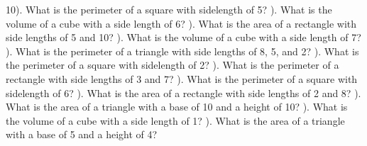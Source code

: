 \documentclass{article}%
\begin{document}
10). What is the perimeter of a square with sidelength of 5?%
\newline%
\newline%
). What is the volume of a cube with a side length of 6?%
\newline%
\newline%
). What is the area of a rectangle with side lengths of 5 and 10?%
\newline%
\newline%
). What is the volume of a cube with a side length of 7?%
\newline%
\newline%
). What is the perimeter of a triangle with side lengths of 8, 5, and 2?%
\newline%
\newline%
). What is the perimeter of a square with sidelength of 2?%
\newline%
\newline%
). What is the perimeter of a rectangle with side lengths of 3 and 7?%
\newline%
\newline%
). What is the perimeter of a square with sidelength of 6?%
\newline%
\newline%
). What is the area of a rectangle with side lengths of 2 and 8?%
\newline%
\newline%
). What is the area of a triangle with a base of 10 and a height of 10?%
\newline%
\newline%
). What is the volume of a cube with a side length of 1?%
\newline%
\newline%
). What is the area of a triangle with a base of 5 and a height of 4?%
\newline%
\newline%
\newline%
\end{document}
